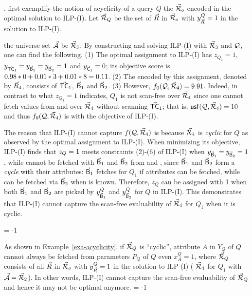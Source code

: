 .  
first exemplify the notion
of acyclicity of a query $Q$ \wrt the \bds $\vec{{\mathcal R}}_{o}$ encoded
in the optimal solution to ILP-(I). Let $\vec{{\mathcal R}}_{Q}$ be the set
of \bss $\vec{R}$ in $\vec{{\mathcal R}}_{o}$ with $y_{\vec{R}}^{Q} = 1$ in
the solution to ILP-(I).


\begin{example}\label{exa-acyclicity}
the universe set $\vec{{\mathcal A}}$   be $\vec{{\mathcal R}}_{3}$.
By constructing and solving ILP-(I) with $\vec{{\mathcal R}}_{3}$ and $\mathcal Q$,
one can find the following.
(1) The optimal assignment to ILP-(I) has
$z_{Q_{1}} = 1$, $y_{\vec{\protect\mathsf{TC}}_{1}} = y_{\vec{\protect\mathsf{B}}_{1}} =
y_{\vec{\protect\mathsf{B}}_{2}} = 1$ and $y_{\vec{\protect\mathsf{C}}_{1}} = 0$; its
objective score is $0.98*0\allowbreak +\allowbreak 0.01*3\allowbreak +\allowbreak 0.01*8\allowbreak =\allowbreak
0.11$.
(2) The \bds encoded by this assignment, denoted by $\vec{R}_{4}$,
consists of $\vec{\protect\mathsf{TC}}_{1}$, $\vec{\protect\mathsf{B}}_{1}$ and
$\vec{\protect\mathsf{B}}_{2}$.
(3) However, $f_{0}(\mathcal Q, \vec{{\mathcal R}}_{4}) = 9.91$. Indeed, in contrast to
what $z_{Q_{1}}= 1$ indicates, $Q_{1}$ is not scan-free over
$\vec{{\mathcal R}}_{4}$ since one cannot fetch  values from
 and  over $\vec{{\mathcal R}}_{4}$ without scanning
$\vec{\protect\mathsf{TC}}_{1}$; that is, ${\mathsf{usf}}(\mathcal Q, \vec{{\mathcal R}}_{4}) = 10$ and
thus $f_{0}(\mathcal Q, \vec{{\mathcal R}}_{4})$ is  with the
objective of ILP-(I).

\vspace{0.6ex}
The reason that ILP-(I) cannot capture $f(\mathcal Q, \vec{{\mathcal R}}_{4})$ is
because $\vec{{\mathcal R}}_{4}$ is {\em cyclic} for $Q$ as observed by the optimal
assignment to ILP-(I). When minimizing its objective, ILP-(I)
finds that $z_{Q}\allowbreak =\allowbreak 1$ meets constraints (2)-(6) of ILP-(I)
when $y_{\vec{\protect\mathsf{B}}_{1}}\allowbreak =\allowbreak y_{\vec{\protect\mathsf{B}}_{2}}\allowbreak =\allowbreak 1$, while
 cannot be fetched with $\vec{\protect\mathsf{B}}_{1}$ and
$\vec{\protect\mathsf{B}}_{2}$ from  and , since
$\vec{\protect\mathsf{B}}_{1}$ and $\vec{\protect\mathsf{B}}_{2}$ form a {\em cycle} with
their attributes: $\vec{\protect\mathsf{B}}_{1}$ fetches  for $Q_{1}$
if  attributes can be fetched, while  can be
fetched via $\vec{\protect\mathsf{B}}_{2}$ when  is known. Therefore,
$z_{Q}$ can be assigned with 1 when both $\vec{\protect\mathsf{B}}_{1}$ and
$\vec{\protect\mathsf{B}}_{2}$ are picked by $y_{\vec{\protect\mathsf{B}}_{1}}^{Q}$ and
$y_{\vec{\protect\mathsf{B}}_{2}}^{Q}$ for $Q$ in ILP-(I). This demonstrates that ILP-(I)
cannot capture the scan-free evaluability of
$\vec{{\mathcal R}}_{4}$ for $Q_{1}$ when it is cyclic.
\end{example}
\looseness = -1

As shown in Example~\ref{exa-acyclicity}, if $\vec{{\mathcal R}}_{Q}$ is
``cyclic'', attribute $A$ in $Y_{Q}$ of $Q$ cannot always be
fetched from parameters $P_{Q}$ of $Q$ even  $x_{A}^{Q} = 1$,
where $\vec{{\mathcal R}}_{Q}$ consists of all \bss $\vec{R}$ in $\vec{{\mathcal R}}_{o}$
with $y_{\vec{R}}^{Q} = 1$ in the solution to ILP-(I) (\ie
$\vec{{\mathcal R}}_{4}$ for $Q_{1}$ with $\vec{{\mathcal A}} = \vec{{\mathcal R}}_{2}$).
In other words, ILP-(I)  cannot capture the scan-free
evaluability of $\vec{{\mathcal R}}_{Q}$ and hence it may not be optimal anymore. 
\looseness = -1

